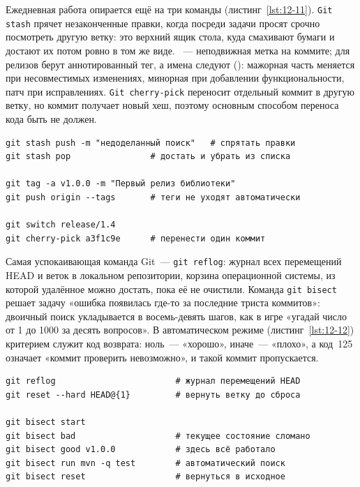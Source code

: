 Ежедневная работа опирается ещё на три команды (листинг~\ref{lst:12-11}). \texttt{Git stash} прячет незаконченные правки, когда посреди задачи просят срочно посмотреть другую ветку: это верхний ящик стола, куда смахивают бумаги и достают их потом ровно в том же виде. ~--- неподвижная метка на коммите; для релизов берут аннотированный тег, а имена следуют  (): мажорная часть меняется при несовместимых изменениях, минорная при добавлении функциональности, патч при исправлениях. \texttt{Git cherry-pick} переносит отдельный коммит в другую ветку, но коммит получает новый хеш, поэтому основным способом переноса кода быть не должен.

\begin{listing}[H]
\begin{verbatim}
git stash push -m "недоделанный поиск"   # спрятать правки
git stash pop                # достать и убрать из списка

git tag -a v1.0.0 -m "Первый релиз библиотеки"
git push origin --tags       # теги не уходят автоматически

git switch release/1.4
git cherry-pick a3f1c9e      # перенести один коммит
\end{verbatim}
\caption{Отложенная работа, теги и перенос коммита}
\label{lst:12-11}
\end{listing}

Самая успокаивающая команда Git~--- \texttt{git reflog}: журнал всех перемещений HEAD и веток в локальном репозитории, корзина операционной системы, из которой удалённое можно достать, пока её не очистили. Команда \texttt{git bisect} решает задачу «ошибка появилась где-то за последние триста коммитов»: двоичный поиск укладывается в восемь-девять шагов, как в игре «угадай число от 1 до 1000 за десять вопросов». В автоматическом режиме (листинг~\ref{lst:12-12}) критерием служит код возврата: ноль~--- «хорошо», иначе~--- «плохо», а код~125 означает «коммит проверить невозможно», и такой коммит пропускается.

\begin{listing}[H]
\begin{verbatim}
git reflog                        # журнал перемещений HEAD
git reset --hard HEAD@{1}         # вернуть ветку до сброса

git bisect start
git bisect bad                    # текущее состояние сломано
git bisect good v1.0.0            # здесь всё работало
git bisect run mvn -q test        # автоматический поиск
git bisect reset                  # вернуться в исходное
\end{verbatim}
\caption{Восстановление истории и поиск виновного коммита}
\label{lst:12-12}
\end{listing}

